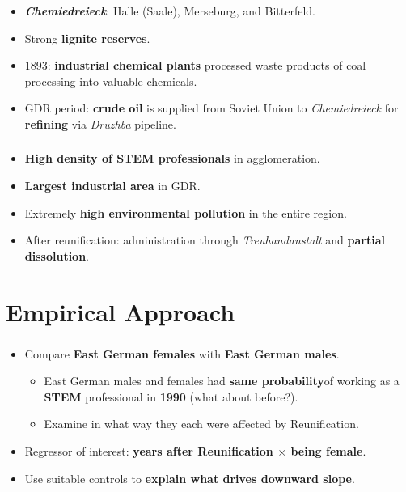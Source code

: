 \documentclass[11pt, aspectratio=1610, xcolor={dvipsnames}]{beamer}
\newcommand{\highlight}[1]{\textbf{\textcolor{PineGreen}{#1}}}
\begin{document}
	\begin{frame}
		\frametitle{}
		
		\begin{itemize}
			\item \highlight{\emph{Chemiedreieck}}: Halle (Saale), Merseburg, and Bitterfeld.
			\item Strong \highlight{lignite reserves}.
			\item 1893: \highlight{industrial chemical plants} processed waste products of coal processing into valuable chemicals.
			\item GDR period: \highlight{crude oil} is supplied from Soviet Union to \emph{Chemiedreieck} for \highlight{refining} via \emph{Druzhba} pipeline.
		\end{itemize}
		
	\end{frame}
	
		\begin{frame}
		\frametitle{}
		
		\begin{itemize}
			\item \highlight{High density of STEM professionals} in agglomeration.
			\item \highlight{Largest industrial area} in GDR.
			\item Extremely \highlight{high environmental pollution} in the entire region.
			\item After reunification: administration through \emph{Treuhandanstalt} and \highlight{partial dissolution}.
		\end{itemize}
		
	\end{frame}
	
	\section{Empirical Approach}
	\begin{frame}
		\frametitle{}
		
		\begin{itemize}
			\item Compare \highlight{East German females} with  \highlight{East German males}.
			\begin{itemize}
				\item East German males and females had \highlight{same probability}\linebreak of working as a \highlight{STEM} professional in \highlight{1990} (what about before?).
				\item Examine in what way they each were affected by Reunification.
			\end{itemize}
			\item Regressor of interest: \highlight{years after Reunification $\times$ being female}.
			\item Use suitable controls to \highlight{explain what drives downward slope}.
		\end{itemize}
		
		
	\end{frame}
	
\end{document}
